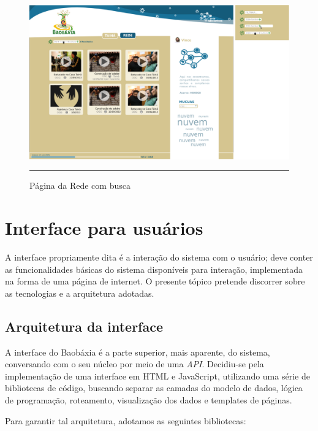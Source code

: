 \begin{figure}[htbp]
  \centering
  \includegraphics[width=\textwidth]{./Fig/layout-pgREDEbusca.pdf}
  \rule{35em}{0.5pt}
  \caption[Página da Rede com busca]{Página da Rede com busca}
  \label{fig:layout-pgREDEbusca}
\end{figure}

\section{Interface para usuários}
A interface propriamente dita é a interação do sistema com o usuário;
deve conter as funcionalidades básicas do sistema disponíveis para
interação, implementada na forma de uma página de internet. O presente
tópico pretende discorrer sobre as tecnologias e a arquitetura adotadas.

\subsection{Arquitetura da interface}
A interface do Baobáxia é a parte superior, mais aparente, do sistema,
conversando com o seu núcleo por meio de uma \emph{API}. Decidiu-se
pela implementação de uma interface em HTML e JavaScript, utilizando
uma série de bibliotecas de código, buscando separar as camadas do modelo
de dados, lógica de programação, roteamento, visualização dos dados e
templates de páginas.

Para garantir tal arquitetura, adotamos as seguintes bibliotecas:

